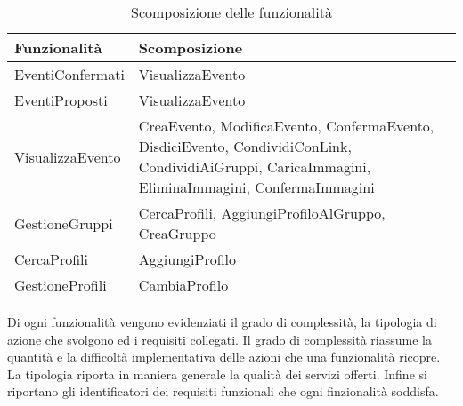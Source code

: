 \begin{table}[htb]
    \centering
    \begin{tabular} {|P{7.3cm}|P{8cm}|}
        \hline
        \textbf{Funzionalità} & \textbf{Scomposizione}                                                                                                                            \\
        \hline
        EventiConfermati      & VisualizzaEvento                                                                                                                                  \\
        \hline
        EventiProposti        & VisualizzaEvento                                                                                                                                  \\
        \hline
        VisualizzaEvento      & CreaEvento, ModificaEvento, ConfermaEvento, DisdiciEvento, CondividiConLink, CondividiAiGruppi, CaricaImmagini, EliminaImmagini, ConfermaImmagini \\
        \hline
        GestioneGruppi        & CercaProfili, AggiungiProfiloAlGruppo, CreaGruppo                                                                                                 \\
        \hline
        CercaProfili          & AggiungiProfilo                                                                                                                                   \\
        \hline
        GestioneProfili       & CambiaProfilo                                                                                                                                     \\
        \hline
    \end{tabular}
    \caption{Scomposizione delle funzionalità}

\end{table}

\clearpage

Di ogni funzionalità vengono evidenziati il grado di complessità, la tipologia di azione che svolgono ed i requisiti collegati.
Il grado di complessità riassume la quantità e la difficoltà implementativa delle azioni che una funzionalità ricopre.
La tipologia riporta in maniera generale la qualità dei servizi offerti.
Infine si riportano gli identificatori dei requisiti funzionali che ogni finzionalità soddisfa.\\

